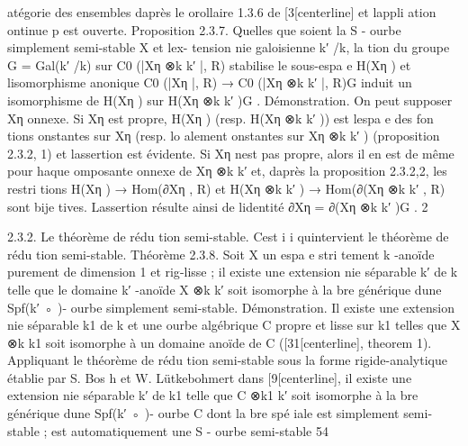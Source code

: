 \documentclass[
  10pt,
]{article}
\newenvironment{Shaded}{}{}
\newcommand{\NormalTok}[1]{#1}
\begin{document}
\begin{Shaded}
\begin{Highlighting}[]
\NormalTok{  atégorie des ensembles d\textquotesingle{}après le orollaire 1.3.6 de [3[centerline] et l\textquotesingle{}appli ation ontinue p est ouverte.}
\NormalTok{Proposition 2.3.7.  Quelles que soient la S {-} ourbe simplement semi{-}stable X et l\textquotesingle{}ex{-}}
\NormalTok{tension nie galoisienne k′ /k, l\textquotesingle{}a tion du groupe G = Gal(k′ /k) sur C0 (|Xη ⊗k k′ |, R) stabilise}
\NormalTok{le sous{-}espa e H(Xη ) et l\textquotesingle{}isomorphisme anonique}
\NormalTok{                                 C0 (|Xη |, R) → C0 (|Xη ⊗k k′ |, R)G}
\NormalTok{induit un isomorphisme de H(Xη ) sur H(Xη ⊗k k′ )G .}
\NormalTok{Démonstration. On peut supposer Xη onnexe.}
\NormalTok{   Si Xη est propre, H(Xη ) (resp. H(Xη ⊗k k′ )) est l\textquotesingle{}espa e des fon tions onstantes sur Xη}
\NormalTok{(resp. lo alement onstantes sur Xη ⊗k k′ ) (proposition 2.3.2, 1) et l\textquotesingle{}assertion est évidente.}
\NormalTok{   Si Xη n\textquotesingle{}est pas propre, alors il en est de même pour haque omposante onnexe de Xη ⊗k k′}
\NormalTok{et, d\textquotesingle{}après la proposition 2.3.2,2, les restri tions}
\NormalTok{                                      H(Xη ) → Hom(∂Xη , R)}
\NormalTok{et}
\NormalTok{                                H(Xη ⊗k k′ ) → Hom(∂(Xη ⊗k k′ , R)}
\NormalTok{sont bije tives. L\textquotesingle{}assertion résulte ainsi de l\textquotesingle{}identité ∂Xη = ∂(Xη ⊗k k′ )G .                   2}

\NormalTok{2.3.2. Le théorème de rédu tion semi{-}stable.}
\NormalTok{   C\textquotesingle{}est i i qu\textquotesingle{}intervient le théorème de rédu tion semi{-}stable.}
\NormalTok{Théorème 2.3.8.  Soit X un espa e stri tement k {-}anoïde purement de dimension 1}
\NormalTok{et rig{-}lisse ; il existe une extension nie séparable k′ de k telle que le domaine k′ {-}anoïde}
\NormalTok{X ⊗k k′ soit isomorphe à la bre générique d\textquotesingle{}une Spf(k′ ◦ ){-} ourbe simplement semi{-}stable.}
\NormalTok{Démonstration. Il existe une extension nie séparable k1 de k et une ourbe algébrique C}
\NormalTok{propre et lisse sur k1 telles que X ⊗k k1 soit isomorphe à un domaine anoïde de C ([31[centerline],}
\NormalTok{theorem 1). Appliquant le théorème de rédu tion semi{-}stable sous la forme rigide{-}analytique}
\NormalTok{établie par S. Bos h et W. Lütkebohmert dans [9[centerline], il existe une extension nie séparable k′}
\NormalTok{de k1 telle que C ⊗k1 k′ soit isomorphe à la bre générique d\textquotesingle{}une Spf(k′ ◦ ){-} ourbe C dont la}
\NormalTok{bre spé iale est simplement semi{-}stable ; \textquotesingle{}est automatiquement une S {-} ourbe semi{-}stable}
\NormalTok{54}




\end{Highlighting}
\end{Shaded}
\end{document}
